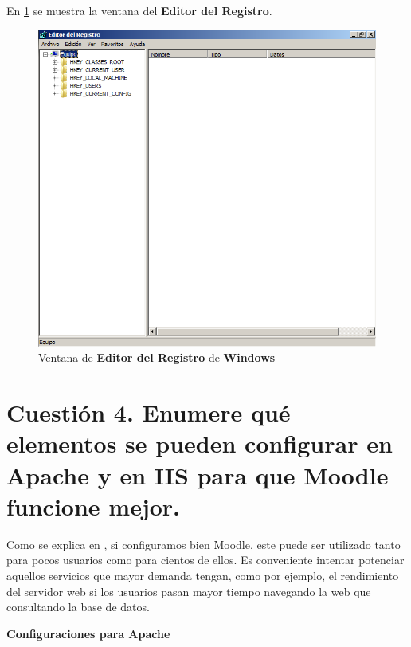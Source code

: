 En \ref{09} se muestra la ventana del \textbf{Editor del Registro}.

\begin{figure}[H]
	\centering
	\includegraphics[scale=0.45]{09}
	\caption{Ventana de \textbf{Editor del Registro} de \textbf{Windows}} \label{09}
\end{figure}

\section{Cuestión 4. Enumere qué elementos se pueden configurar en Apache y en IIS para que Moodle funcione mejor.}

Como se explica en \cite{moodleperf}, si configuramos bien Moodle, este puede ser utilizado tanto para pocos usuarios como para cientos de ellos. Es conveniente intentar potenciar aquellos servicios que mayor demanda tengan, como por ejemplo, el rendimiento del servidor web si los usuarios pasan mayor tiempo navegando la web que consultando la base de datos.

\textbf{Configuraciones para Apache}

